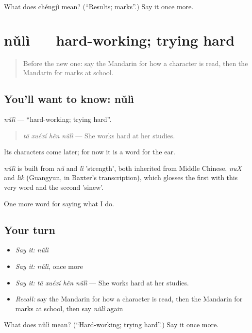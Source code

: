 \begin{tcolorbox}[breakable,colback=teal!4,colframe=teal!35!black,title={Before you move on}]
What does chéngjì mean? (\textquotedblleft{}Results; marks\textquotedblright{}.) Say it once more.
\end{tcolorbox}
\section[nǔlì]{nǔlì — hard-working; trying hard}

\label{lesson:ZH-C249-nuli}



\begin{quote}
Before the new one: say the Mandarin for how a character is read, then the Mandarin for marks at school.
\end{quote}

\subsection*{You'll want to know: nǔlì}
\emph{nǔlì} — \textquotedblleft{}hard-working; trying hard\textquotedblright{}.

\begin{quote}
\emph{tā xuéxí hěn nǔlì} — She works hard at her studies.
\end{quote}

Its characters come later; for now it is a word for the ear.

\begin{cousinweb}
\emph{nǔlì} is built from \emph{nǔ} and \emph{lì} 'strength', both inherited from Middle Chinese, \emph{nuX} and \emph{lik} (Guangyun, in Baxter's transcription), which glosses the first with this very word and the second 'sinew'.
\end{cousinweb}

\begin{grammarlens}[title={What you've built}]
One more word for saying what I do.
\end{grammarlens}

\subsection*{Your turn}
\begin{itemize}
\raggedright
  \item \emph{Say it:} \emph{nǔlì}
  \item \emph{Say it:} \emph{nǔlì}, once more
  \item \emph{Say it:} \emph{tā xuéxí hěn nǔlì} — She works hard at her studies.
  \item \emph{Recall:} say the Mandarin for how a character is read, then the Mandarin for marks at school, then say \emph{nǔlì} again
\end{itemize}

\begin{tcolorbox}[breakable,colback=teal!4,colframe=teal!35!black,title={Before you move on}]
What does nǔlì mean? (\textquotedblleft{}Hard-working; trying hard\textquotedblright{}.) Say it once more.
\end{tcolorbox}
